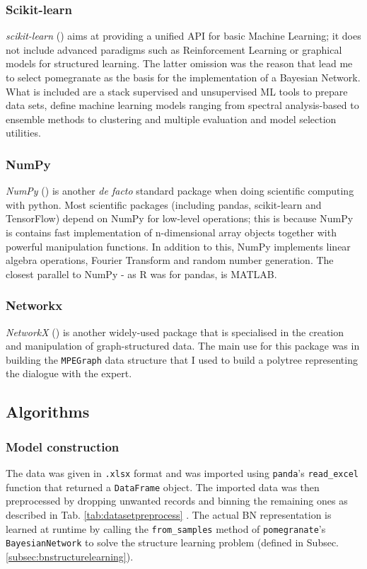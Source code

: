 \subsubsection{Scikit-learn}
\textit{scikit-learn} (\cite{scikitlearn}) aims at providing a unified API for basic Machine Learning; it does not include advanced paradigms such as Reinforcement Learning or graphical models for structured learning.
The latter omission was the reason that lead me to select pomegranate as the basis for the implementation of a Bayesian Network.
What is included are a stack supervised and unsupervised ML tools to prepare data sets, define machine learning models ranging from spectral analysis-based to ensemble methods to clustering and multiple evaluation and model selection utilities.

\subsubsection{NumPy}
\textit{NumPy} (\cite{numpy}) is another \textit{de facto} standard package when doing scientific computing with python.
Most scientific packages (including pandas, scikit-learn and TensorFlow) depend on NumPy for low-level operations; this is because NumPy is contains fast implementation of n-dimensional array objects together with powerful manipulation functions.
In addition to this, NumPy implements linear algebra operations, Fourier Transform and random number generation.
The closest parallel to NumPy - as R was for pandas, is MATLAB.

\subsubsection{Networkx}
\textit{NetworkX} (\cite{networkx}) is another widely-used package that is specialised in the creation and manipulation of graph-structured data.
The main use for this package was in building the \texttt{MPEGraph} data structure that I used to build a polytree representing the dialogue with the expert.

\subsection{Algorithms} \label{subsec:algorithms}

\subsubsection{Model construction}
The data was given in \texttt{.xlsx} format and was imported using \texttt{panda}'s \texttt{read\_excel} function that returned a \texttt{DataFrame} object.
The imported data was then preprocessed by dropping unwanted records and binning the remaining ones as described in Tab. \ref{tab:datasetpreprocess} .
The actual BN representation is learned at runtime by calling the \texttt{from\_samples} method of \texttt{pomegranate}'s \texttt{BayesianNetwork} to solve the structure learning problem (defined in Subsec. \ref{subsec:bnstructurelearning}).

